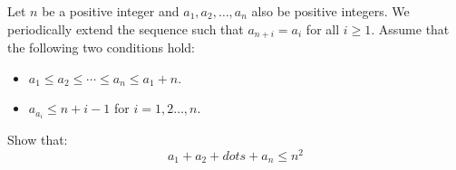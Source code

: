 Let $n$ be a positive integer and $a_1,a_2, \dots,a_n$ also be positive integers.
We periodically extend the sequence such that $a_{n+i} = a_i$ for all $i\geq 1$.
Assume that the following two conditions hold:
\begin{itemize}
    \item $a_1\leq a_2\leq\cdots \leq a_n\leq a_1 +n$.
    \item $a_{a_i} \leq n+i-1$ for $i=1,2\dots,n$.
\end{itemize}
Show that:
$$a_1+a_2+dots +a_n \leq n^2$$
